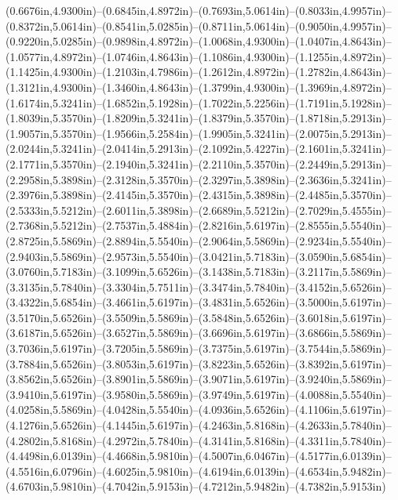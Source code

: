 (0.6676in,4.9300in)--(0.6845in,4.8972in)--(0.7693in,5.0614in)--(0.8033in,4.9957in)--(0.8372in,5.0614in)--(0.8541in,5.0285in)--(0.8711in,5.0614in)--(0.9050in,4.9957in)--(0.9220in,5.0285in)--(0.9898in,4.8972in)--(1.0068in,4.9300in)--(1.0407in,4.8643in)--(1.0577in,4.8972in)--(1.0746in,4.8643in)--(1.1086in,4.9300in)--(1.1255in,4.8972in)--(1.1425in,4.9300in)--(1.2103in,4.7986in)--(1.2612in,4.8972in)--(1.2782in,4.8643in)--(1.3121in,4.9300in)--(1.3460in,4.8643in)--(1.3799in,4.9300in)--(1.3969in,4.8972in)--(1.6174in,5.3241in)--(1.6852in,5.1928in)--(1.7022in,5.2256in)--(1.7191in,5.1928in)--(1.8039in,5.3570in)--(1.8209in,5.3241in)--(1.8379in,5.3570in)--(1.8718in,5.2913in)--(1.9057in,5.3570in)--(1.9566in,5.2584in)--(1.9905in,5.3241in)--(2.0075in,5.2913in)--(2.0244in,5.3241in)--(2.0414in,5.2913in)--(2.1092in,5.4227in)--(2.1601in,5.3241in)--(2.1771in,5.3570in)--(2.1940in,5.3241in)--(2.2110in,5.3570in)--(2.2449in,5.2913in)--(2.2958in,5.3898in)--(2.3128in,5.3570in)--(2.3297in,5.3898in)--(2.3636in,5.3241in)--(2.3976in,5.3898in)--(2.4145in,5.3570in)--(2.4315in,5.3898in)--(2.4485in,5.3570in)--(2.5333in,5.5212in)--(2.6011in,5.3898in)--(2.6689in,5.5212in)--(2.7029in,5.4555in)--(2.7368in,5.5212in)--(2.7537in,5.4884in)--(2.8216in,5.6197in)--(2.8555in,5.5540in)--(2.8725in,5.5869in)--(2.8894in,5.5540in)--(2.9064in,5.5869in)--(2.9234in,5.5540in)--(2.9403in,5.5869in)--(2.9573in,5.5540in)--(3.0421in,5.7183in)--(3.0590in,5.6854in)--(3.0760in,5.7183in)--(3.1099in,5.6526in)--(3.1438in,5.7183in)--(3.2117in,5.5869in)--(3.3135in,5.7840in)--(3.3304in,5.7511in)--(3.3474in,5.7840in)--(3.4152in,5.6526in)--(3.4322in,5.6854in)--(3.4661in,5.6197in)--(3.4831in,5.6526in)--(3.5000in,5.6197in)--(3.5170in,5.6526in)--(3.5509in,5.5869in)--(3.5848in,5.6526in)--(3.6018in,5.6197in)--(3.6187in,5.6526in)--(3.6527in,5.5869in)--(3.6696in,5.6197in)--(3.6866in,5.5869in)--(3.7036in,5.6197in)--(3.7205in,5.5869in)--(3.7375in,5.6197in)--(3.7544in,5.5869in)--(3.7884in,5.6526in)--(3.8053in,5.6197in)--(3.8223in,5.6526in)--(3.8392in,5.6197in)--(3.8562in,5.6526in)--(3.8901in,5.5869in)--(3.9071in,5.6197in)--(3.9240in,5.5869in)--(3.9410in,5.6197in)--(3.9580in,5.5869in)--(3.9749in,5.6197in)--(4.0088in,5.5540in)--(4.0258in,5.5869in)--(4.0428in,5.5540in)--(4.0936in,5.6526in)--(4.1106in,5.6197in)--(4.1276in,5.6526in)--(4.1445in,5.6197in)--(4.2463in,5.8168in)--(4.2633in,5.7840in)--(4.2802in,5.8168in)--(4.2972in,5.7840in)--(4.3141in,5.8168in)--(4.3311in,5.7840in)--(4.4498in,6.0139in)--(4.4668in,5.9810in)--(4.5007in,6.0467in)--(4.5177in,6.0139in)--(4.5516in,6.0796in)--(4.6025in,5.9810in)--(4.6194in,6.0139in)--(4.6534in,5.9482in)--(4.6703in,5.9810in)--(4.7042in,5.9153in)--(4.7212in,5.9482in)--(4.7382in,5.9153in) 
